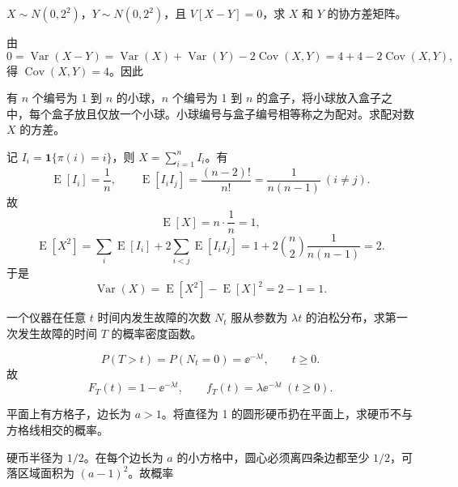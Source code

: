 ﻿

\begin{question}
$X\sim N(0,2^2)$，$Y\sim N(0,2^2)$，且 $V[X-Y]=0$，求 $X$ 和 $Y$ 的协方差矩阵。
\begin{solution}
由
\[
0=\operatorname{Var}(X-Y)=\operatorname{Var}(X)+\operatorname{Var}(Y)-2\operatorname{Cov}(X,Y)
=4+4-2\operatorname{Cov}(X,Y),
\]
得 $\operatorname{Cov}(X,Y)=4$。因此
\end{solution}
\end{question}

\begin{question}
有 $n$ 个编号为 1 到 $n$ 的小球，$n$ 个编号为 1 到 $n$ 的盒子，将小球放入盒子之中，每个盒子放且仅放一个小球。小球编号与盒子编号相等称之为配对。求配对数 $X$ 的方差。
\begin{solution}
记 $I_i=\mathbf 1\{\pi(i)=i\}$，则 $X=\sum_{i=1}^n I_i$。有
\[
\operatorname{E}[I_i]=\frac1n,
\qquad \operatorname{E}[I_iI_j]=\frac{(n-2)!}{n!}=\frac{1}{n(n-1)}\ (i\ne j).
\]
故
\[
\operatorname{E}[X]=n\cdot\frac1n=1,
\]
\[
\operatorname{E}[X^2]=\sum_i\operatorname{E}[I_i]+2\sum_{i<j}\operatorname{E}[I_iI_j]
=1+2\binom n2\frac{1}{n(n-1)}=2.
\]
于是
\[
\operatorname{Var}(X)=\operatorname{E}[X^2]-\operatorname{E}[X]^2=2-1=1.
\]
\end{solution}
\end{question}

\begin{question}
一个仪器在任意 $t$ 时间内发生故障的次数 $N_t$ 服从参数为 $\lambda t$ 的泊松分布，求第一次发生故障的时间 $T$ 的概率密度函数。
\begin{solution}
\[
P(T>t)=P(N_t=0)=\ee^{-\lambda t},\qquad t\ge 0.
\]
故
\[
F_T(t)=1-\ee^{-\lambda t},\qquad
f_T(t)=\lambda \ee^{-\lambda t}\ (t\ge 0).
\]
\end{solution}
\end{question}

\begin{question}
平面上有方格子，边长为 $a>1$。将直径为 1 的圆形硬币扔在平面上，求硬币不与方格线相交的概率。
\begin{solution}
硬币半径为 $1/2$。在每个边长为 $a$ 的小方格中，圆心必须离四条边都至少 $1/2$，可落区域面积为 $(a-1)^2$。故概率
\end{solution}
\end{question}

